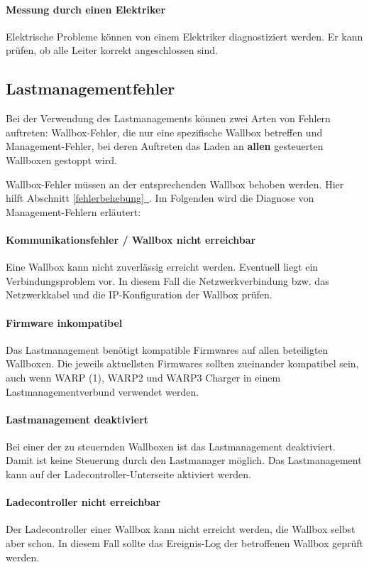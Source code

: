 \documentclass[a4paper,10pt]{article}
\newcommand*{\fullref}[1]{Abschnitt \hyperref[{#1}]{\ref*{#1}~\nameref*{#1}}}
\begin{document}
\begin{multicols*}{2}
    \paragraph{Messung durch einen Elektriker} Elektrische Probleme können von
        einem Elektriker diagnostiziert werden. Er kann prüfen, ob alle Leiter
        korrekt angeschlossen sind.

    \subsection{Lastmanagementfehler}
    Bei der Verwendung des Lastmanagements können zwei Arten von Fehlern auftreten: Wallbox-Fehler, die nur eine spezifische Wallbox betreffen und Management-Fehler,
    bei deren Auftreten das Laden an \textbf{allen} gesteuerten Wallboxen gestoppt wird.

    Wallbox-Fehler müssen an der entsprechenden Wallbox behoben werden. Hier
	hilft \fullref{fehlerbehebung}. Im Folgenden wird die Diagnose von Management-Fehlern erläutert:

    \paragraph{Kommunikationsfehler / Wallbox nicht erreichbar}
    Eine Wallbox kann nicht zuverlässig erreicht werden. Eventuell liegt ein
	Verbindungsproblem vor. In diesem Fall die Netzwerkverbindung bzw. das
	Netzwerkkabel und die IP-Konfiguration der Wallbox prüfen.

    \paragraph{Firmware inkompatibel}
    Das Lastmanagement benötigt kompatible Firmwares auf allen beteiligten Wallboxen. Die jeweils aktuellsten Firmwares sollten zueinander kompatibel sein,
    auch wenn WARP (1), WARP2 und WARP3 Charger in einem Lastmanagementverbund verwendet werden.

    \paragraph{Lastmanagement deaktiviert}
    Bei einer der zu steuernden Wallboxen ist das Lastmanagement deaktiviert. Damit ist keine Steuerung durch den Lastmanager möglich. Das Lastmanagement kann auf der Ladecontroller-Unterseite aktiviert werden.

    \paragraph{Ladecontroller nicht erreichbar}
    Der Ladecontroller einer Wallbox kann nicht erreicht werden, die Wallbox
	selbst aber schon. In diesem Fall sollte das Ereignis-Log der betroffenen
	Wallbox geprüft werden.


\end{multicols*}
\end{document}
